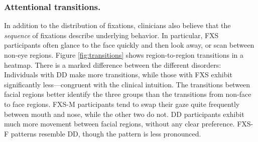 \documentclass{llncs}
\begin{document}
\vspace{- 2em}
\subsubsection{Attentional transitions.}
In addition to the distribution of fixations, clinicians also believe that the \emph{sequence} of fixations describe underlying behavior. In particular, FXS participants often glance to the face quickly and then look away, or scan between non-eye regions. Figure \ref{fig:transitions} shows region-to-region transitions in a heatmap. There is a marked difference between the different disorders: Individuals with DD make more transitions, while those with FXS exhibit significantly less---congruent with the clinical intuition. The transitions between facial regions better identify the three groups than the transitions from non-face to face regions. FXS-M participants tend to swap their gaze quite frequently between mouth and nose, while the other two do not. DD participants exhibit much more movement between facial regions, without any clear preference. FXS-F patterns resemble DD, though the pattern is less pronounced.
\end{document}
